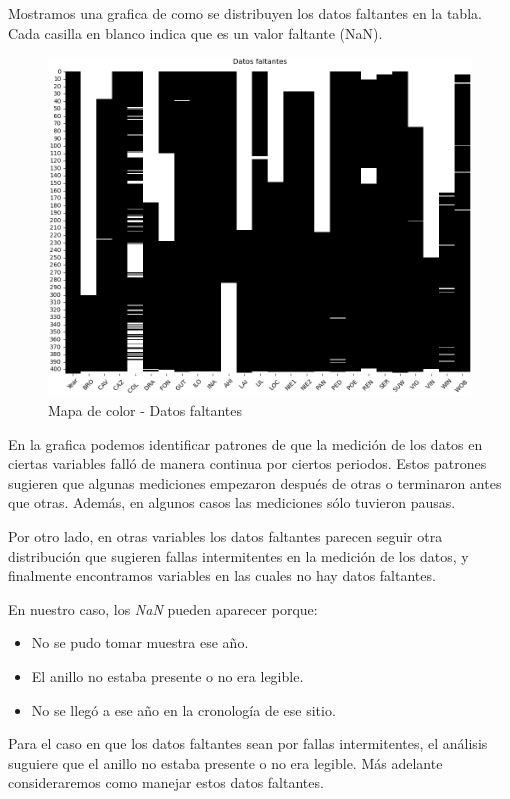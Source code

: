 \documentclass[a4paper,11pt]{article}
\begin{document}
\newpage


Mostramos una grafica de como se distribuyen los datos faltantes en la tabla.
Cada casilla en blanco indica que es un valor faltante (NaN).

\begin{figure}[ht]
	\centering
	\includegraphics[width=0.7\linewidth]{figures/faltantes}
	\caption{Mapa de color - Datos faltantes}
	\label{fig:faltantes}
\end{figure}

\newpage

En la grafica podemos identificar patrones de que la medición de los datos en
ciertas variables falló de manera continua por ciertos periodos. Estos patrones
sugieren que algunas mediciones empezaron después de otras o terminaron antes
que otras. Además, en algunos casos las mediciones sólo tuvieron pausas.

Por otro lado, en otras variables los datos faltantes parecen seguir otra
distribución que sugieren fallas intermitentes en la medición de los datos, y
finalmente encontramos variables en las cuales no hay datos faltantes.

En nuestro caso, los \textit{NaN} pueden aparecer porque:
\begin{itemize}
    \item No se pudo tomar muestra ese año.

    \item El anillo no estaba presente o no era legible.

    \item No se llegó a ese año en la cronología de ese sitio.
\end{itemize}

Para el caso en que los datos faltantes sean por fallas intermitentes, el
análisis suguiere que el anillo no estaba presente o no era legible. Más
adelante consideraremos como manejar estos datos faltantes.
\end{document}
